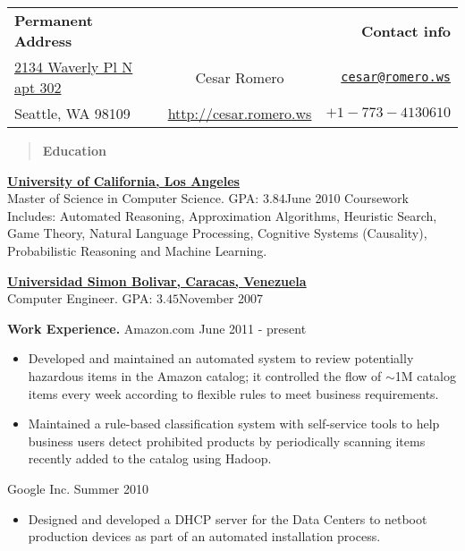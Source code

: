 \documentclass[10pt]{article}
\newcommand{\vitem}{\vspace*{-.4pc}\item}
\begin{document}
\begin{tabular}{lcr}
  \textbf{Permanent Address}&&\textbf{Contact info}\\
  \href{https://maps.google.com/maps?q=2134+Waverly+Pl+N,+Seattle,+WA&hl=en&sll=47.613028,-122.342064&sspn=0.28838,0.547256&oq=2134&hnear=2134+Waverly+Pl+N,+Seattle,+King,+Washington+98109&t=m&z=16}{2134
    Waverly Pl N apt 302}&\hspace*{2cm}\huge{Cesar Romero}\hspace*{2cm}&\href{mailto:cesar@romero.ws}{\texttt{cesar@romero.ws}}\\
Seattle, WA 98109&\href{http://cesar.romero.ws}{http://cesar.romero.ws}&$+1-773-4130610$\\
\end{tabular}
\underline{\makebox[\textwidth]{\hfill}}
\begin{quote}
  \centering{}
 \textbf{Education}  
\end{quote}
\href{http://www.ucla.edu}{\textbf{University of California, Los Angeles}}\\
Master of Science in Computer Science. GPA: $3.84$\hfill June 2010
Coursework Includes: Automated Reasoning, Approximation Algorithms,
Heuristic Search, Game Theory, Natural Language Processing, Cognitive
Systems (Causality), Probabilistic Reasoning and Machine Learning.

\noindent\href{http://www.usb.ve}{\textbf{Universidad Simon Bolivar, Caracas, Venezuela}}\\
Computer Engineer. GPA: $3.45$\hfill November 2007

\centering{}\textbf{Work Experience.}
 Amazon.com \hfill June 2011 - present
\begin{itemize}
  \vitem Developed and maintained an automated system to review
  potentially hazardous items in the Amazon catalog; it controlled the
  flow of $\sim$1M catalog items every week according to flexible rules to
  meet business requirements.
  \vitem Maintained a rule-based classification system with
  self-service tools to help business users detect prohibited products
  by periodically scanning items recently added to the catalog using Hadoop.
\end{itemize}

 Google Inc. \hfill Summer 2010
\begin{itemize}
  \vitem Designed and developed a DHCP server for the Data Centers to
  netboot production devices as part of an automated installation
  process.
\end{itemize}
\end{document}
